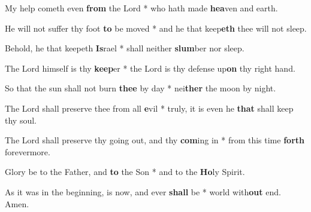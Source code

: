 \begin{multicols}{2}
	My help cometh even \textbf{from} the Lord * who hath made \textbf{hea}ven and earth.
	
	He will not suffer thy foot \textbf{to} be moved * and he that keep\textbf{eth} thee will not sleep.
	
	Behold, he that keepeth \textbf{Is}rael * shall neither \textbf{slum}ber nor sleep.
	
	The Lord himself is thy \textbf{keep}er * the Lord is thy defense up\textbf{on} thy right hand.
	
	So that the sun shall not burn \textbf{thee} by day * nei\textbf{ther} the moon by night.
	
	The Lord shall preserve thee from all \textbf{e}vil * truly, it is even he \textbf{that} shall keep thy soul.
	
	The Lord shall preserve thy going out, and thy \textbf{com}ing in * from this time \textbf{forth} forevermore.
	
	Glory be to the Father, and \textbf{to} the Son * and to the \textbf{Ho}ly Spirit.
	
	As it was in the beginning, is now, and ever \textbf{shall} be * world with\textbf{out} end. Amen.
\end{multicols}